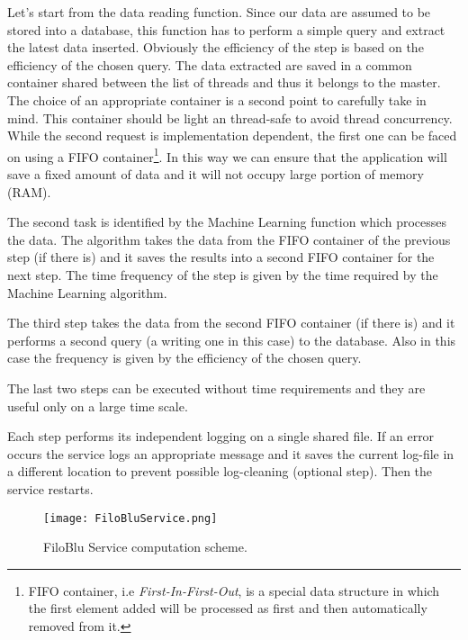 \documentclass{standalone}
\begin{document}
Let's start from the data reading function.
Since our data are assumed to be stored into a database, this function has to perform a simple query and extract the latest data inserted.
Obviously the efficiency of the step is based on the efficiency of the chosen query.
The data extracted are saved in a common container shared between the list of threads and thus it belongs to the master.
The choice of an appropriate container is a second point to carefully take in mind.
This container should be light an thread-safe to avoid thread concurrency.
While the second request is implementation dependent, the first one can be faced on using a \textsf{FIFO} container\footnote{
  FIFO container, i.e \emph{First-In-First-Out}, is a special data structure in which the first element added will be processed as first and then automatically removed from it.
}.
In this way we can ensure that the application will save a fixed amount of data and it will not occupy large portion of memory (RAM).

The second task is identified by the Machine Learning function which processes the data.
The algorithm takes the data from the \textsf{FIFO} container of the previous step (if there is) and it saves the results into a second \textsf{FIFO} container for the next step.
The time frequency of the step is given by the time required by the Machine Learning algorithm.

The third step takes the data from the second \textsf{FIFO} container (if there is) and it performs a second query (a writing one in this case) to the database.
Also in this case the frequency is given by the efficiency of the chosen query.

The last two steps can be executed without time requirements and they are useful only on a large time scale.

Each step performs its independent logging on a single shared file.
If an error occurs the service logs an appropriate message and it saves the current log-file in a different location to prevent possible log-cleaning (optional step).
Then the service restarts.

\begin{figure}[htbp]
\centering
\texttt{[image: FiloBluService.png]}
\caption{FiloBlu Service computation scheme.
}
\label{fig:FiloBlu}
\end{figure}
\end{document}
